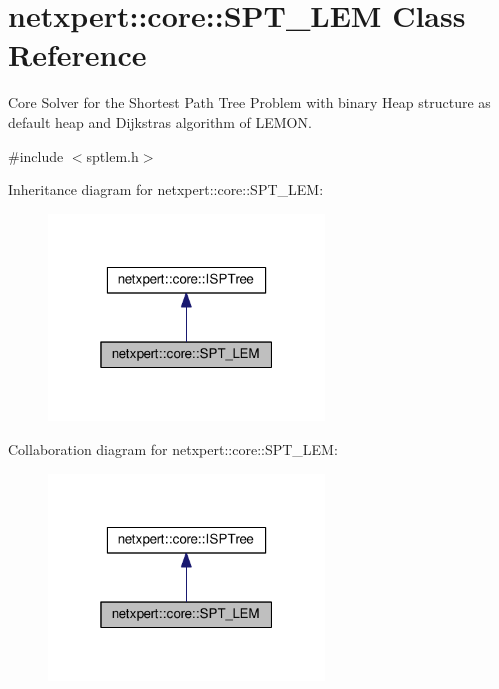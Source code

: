 \hypertarget{classnetxpert_1_1core_1_1SPT__LEM}{}\section{netxpert\+:\+:core\+:\+:S\+P\+T\+\_\+\+L\+EM Class Reference}
\label{classnetxpert_1_1core_1_1SPT__LEM}


Core Solver for the Shortest Path Tree Problem with binary Heap structure as default heap and Dijkstra\textquotesingle{}s algorithm of L\+E\+M\+ON.  




{\ttfamily \#include $<$sptlem.\+h$>$}



Inheritance diagram for netxpert\+:\+:core\+:\+:S\+P\+T\+\_\+\+L\+EM\+:\nopagebreak
\begin{figure}[H]
\begin{center}
\leavevmode
\includegraphics[width=208pt]{classnetxpert_1_1core_1_1SPT__LEM__inherit__graph}
\end{center}
\end{figure}


Collaboration diagram for netxpert\+:\+:core\+:\+:S\+P\+T\+\_\+\+L\+EM\+:\nopagebreak
\begin{figure}[H]
\begin{center}
\leavevmode
\includegraphics[width=208pt]{classnetxpert_1_1core_1_1SPT__LEM__coll__graph}
\end{center}
\end{figure}
